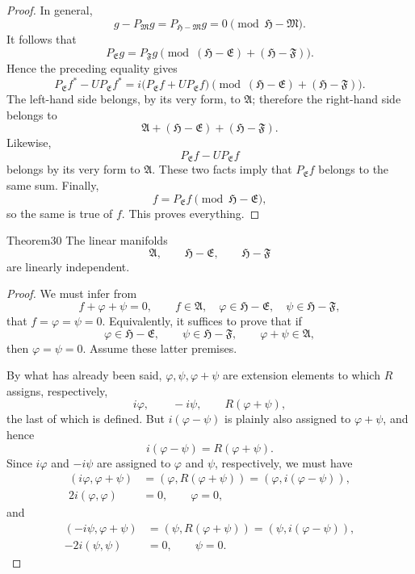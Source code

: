 ﻿\documentclass[paper=b5,fontsize=13pt,bookmarkpackage=false,twoside]{scrartcl}
\begin{document}
\begin{proof}
In general,
\[
g-P_{\mathfrak M}g=P_{\mathfrak H-\mathfrak M}g
=0\pmod{\mathfrak H-\mathfrak M}.
\]
It follows that
\[
P_{\mathfrak E}g
=P_{\mathfrak F}g
\pmod{(\mathfrak H-\mathfrak E)+(\mathfrak H-\mathfrak F)}.
\]
Hence the preceding equality gives
\[
P_{\mathfrak E}f^*-UP_{\mathfrak E}f^*
=i\bigl(P_{\mathfrak E}f+UP_{\mathfrak E}f\bigr)
\pmod{(\mathfrak H-\mathfrak E)+(\mathfrak H-\mathfrak F)}.
\]
The left-hand side belongs, by its very form, to $\mathfrak A$; therefore the right-hand side belongs to
\[
\mathfrak A+(\mathfrak H-\mathfrak E)+(\mathfrak H-\mathfrak F).
\]
Likewise,
\[
P_{\mathfrak E}f-UP_{\mathfrak E}f
\]
belongs by its very form to $\mathfrak A$. These two facts imply that $P_{\mathfrak E}f$ belongs to the same sum. Finally,
\[
f=P_{\mathfrak E}f\pmod{\mathfrak H-\mathfrak E},
\]
so the same is true of $f$. This proves everything.
\end{proof}

\begin{namedstatement}{Theorem}{30}\label{thm:30}
The linear manifolds
\[
\mathfrak A,\qquad \mathfrak H-\mathfrak E,\qquad
\mathfrak H-\mathfrak F
\]
are linearly independent.
\end{namedstatement}

\begin{proof}
We must infer from
\[
f+\varphi+\psi=0,
\qquad
f\in\mathfrak A,\quad
\varphi\in\mathfrak H-\mathfrak E,\quad
\psi\in\mathfrak H-\mathfrak F,
\]
that $f=\varphi=\psi=0$. Equivalently, it suffices to prove that if
\[
\varphi\in\mathfrak H-\mathfrak E,\qquad
\psi\in\mathfrak H-\mathfrak F,\qquad
\varphi+\psi\in\mathfrak A,
\]
then $\varphi=\psi=0$. Assume these latter premises.

By what has already been said, $\varphi,\psi,\varphi+\psi$ are extension elements to which $R$ assigns, respectively,
\[
i\varphi,\qquad -i\psi,\qquad R(\varphi+\psi),
\]
the last of which is defined. But $i(\varphi-\psi)$ is plainly also assigned to $\varphi+\psi$, and hence
\[
i(\varphi-\psi)=R(\varphi+\psi).
\]
Since $i\varphi$ and $-i\psi$ are assigned to $\varphi$ and $\psi$, respectively, we must have
\begin{align*}
(i\varphi,\varphi+\psi)
 &=(\varphi,R(\varphi+\psi))
  =(\varphi,i(\varphi-\psi)),\\
2i(\varphi,\varphi)&=0,\qquad \varphi=0,
\end{align*}
and
\begin{align*}
(-i\psi,\varphi+\psi)
 &=(\psi,R(\varphi+\psi))
  =(\psi,i(\varphi-\psi)),\\
-2i(\psi,\psi)&=0,\qquad \psi=0.
\end{align*}
\end{proof}
\end{document}
